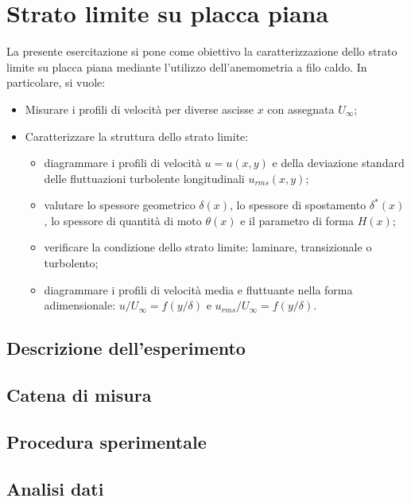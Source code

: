 \section{Strato limite su placca piana}\label{c9}
La presente esercitazione si pone come obiettivo la caratterizzazione dello strato limite su placca piana mediante l'utilizzo dell'anemometria a filo caldo. In particolare, si vuole:
\begin{itemize}
    \item Misurare i profili di velocità per diverse ascisse $x$ con assegnata $U_\infty$;
    \item Caratterizzare la struttura dello strato limite:
    \begin{itemize}
        \item diagrammare i profili di velocità $u=u(x,y)$ e della deviazione standard delle fluttuazioni turbolente longitudinali $u_{rms}(x,y)$;
        \item valutare lo spessore geometrico $\delta(x)$, lo spessore di spostamento $\delta^*(x)$, lo spessore di quantità di moto $\theta(x)$ e il parametro di forma $H(x)$;
        \item verificare la condizione dello strato limite: laminare, transizionale o turbolento;
        \item diagrammare i profili di velocità media e fluttuante nella forma adimensionale: $u/U_\infty = f(y/\delta)$ e $u_{rms}/U_\infty = f(y/\delta)$.
    \end{itemize}
\end{itemize}

\subsection{Descrizione dell'esperimento}

\subsection{Catena di misura}

\subsection{Procedura sperimentale}

\subsection{Analisi dati}
